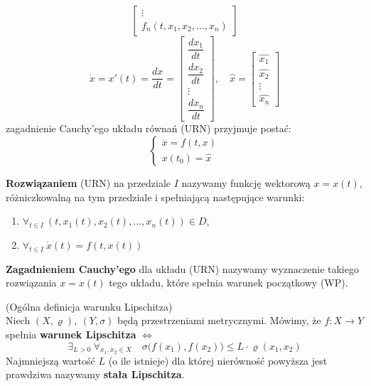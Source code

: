\begin{df}
$$\begin{bmatrix}
\vdots\\
f_n(t,x_1,x_2,\ldots,x_n)
\end{bmatrix}$$
$$\dot{x}=x'(t)=\dfrac{dx}{dt}=
\begin{bmatrix}
\dfrac{dx_1}{dt}\\
\dfrac{dx_2}{dt}\\
\vdots\\
\dfrac{dx_n}{dt}
\end{bmatrix},\quad \hat{x}=
\begin{bmatrix}
\hat{x_1}\\
\hat{x_2}\\
\vdots\\
\hat{x_n}
\end{bmatrix}$$
zagadnienie Cauchy'ego układu równań (URN) przyjmuje postać:
$$\left\{\begin{array}{l}
\dot{x}=f(t,x)\\
x(t_0)=\hat{x}
\end{array}\right.$$
\end{df}

\begin{df}
\textbf{Rozwiązaniem} (URN) na przedziale $I$ nazywamy funkcję wektorową $x=x(t)$, różniczkowalną na tym przedziale i spełniającą następujące warunki:
\begin{enumerate}[\rm 1.]
\item
$\forall_{t\in I}\ (t,x_1(t),x_2(t),\ldots,x_n(t))\in D$,
\item
$\forall_{t\in I}\ \dot{x}(t)=f(t,x(t))$
\end{enumerate}
\end{df}

\begin{df}
\textbf{Zagadnieniem Cauchy'ego} dla układu (URN) nazywamy wyznaczenie takiego rozwiązania $x=x(t)$ tego układu, które spełnia warunek początkowy (WP).
\end{df}

\begin{df}{(Ogólna definicja warunku Lipschitza)}\\
Niech $(X,\varrho),\ (Y,\sigma)$ będą przestrzeniami metrycznymi. Mówimy, że $f:X\rightarrow Y$ spełnia \textbf{warunek Lipschitza} $\Leftrightarrow$ $$\exists_{L>0}\ \forall_{x_1,x_2\in X}\quad\sigma\big(f(x_1),f(x_2)\big)\leqslant L\cdot\varrho(x_1,x_2)$$
Najmniejszą wartość $L$ (o ile istnieje) dla której nierówność powyższa jest prawdziwa nazywamy \textbf{stała Lipschitza}.
\end{df}

